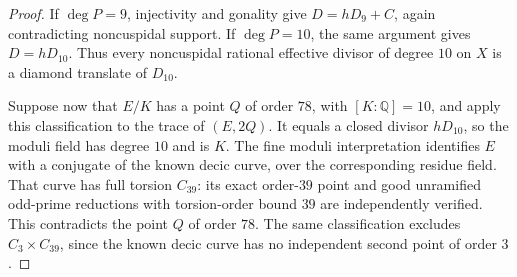 \begin{proof}
If $\deg P=9$, injectivity and gonality give $D=hD_9+C$,
again contradicting noncuspidal support.
If $\deg P=10$, the same argument gives $D=hD_{10}$.
Thus every noncuspidal rational effective divisor of degree $10$
on $X$ is a diamond translate of $D_{10}$.

Suppose now that $E/K$ has a point $Q$ of order $78$, with
$[K:\mathbb Q]=10$, and apply this classification to the trace
of $(E,2Q)$. It equals a closed divisor $hD_{10}$, so the moduli
field has degree $10$ and is $K$.
The fine moduli interpretation identifies $E$ with a conjugate
of the known decic curve, over the corresponding residue field.
That curve has full torsion $C_{39}$: its exact order-$39$ point
and good unramified odd-prime reductions with torsion-order
bound $39$ are independently verified.
This contradicts the point $Q$ of order $78$.
The same classification excludes $C_3\times C_{39}$, since the
known decic curve has no independent second point of order $3$.
\end{proof}
